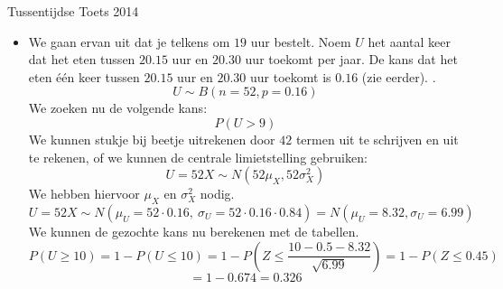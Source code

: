 \documentclass[main.tex]{subfiles}
\begin{document}
\begin{examenvraag}{Tussentijdse Toets 2014}
\begin{ex-antwoord}
\begin{itemize}
\begin{itemize}
        $P(A|B)$ is de kans op de gegeven wachttijd, gegeven dat we bij Yumm's bestellen.
        \[ P(A|B) = P(75 \le X \le 90) \]
        Omdat $X$ normaal verdeeld is, kunnen we deze kans berekenen met behulp van onze tabellen.
        \[ P(75 \le X \le 90) = P(\frac{75-60}{20} \le Z \le \frac{90-60}{20}) = P(Z \le 1.5) - P(Z \le 0.75)\]
        \[ = 0.933 - 0.773 = \frac{4}{25} = 0.16 \]
      \item $P(A|B^{C})$:\\
        $P(A|B^{C})$ is de kans op de gegeven wachttijd, gegeven dat we bij Tasty bestellen.
        \[ P(A|B^{C} = P(75 \le Y \le 90) \]
        Omdat $Y$ normaal verdeeld is, kunnen we deze kans berekenen met behulp van onze tabellen.
        \[ P(75 \le Y \le 90) = P(\frac{75-75}{10} \le Z \le \frac{90-75}{10}) = P(Z \le 1.5) - P(Z \le 0) \]
        \[ = 0.933 - 0.5 = \frac{433}{1000} = 0.433 \]
      \end{itemize}
      We kunnen nu de gevraagde kans uitrekenen:
      \[ \frac{P(A|B)P(B)}{P(A|B)P(B) + P(A|B^{C})P(B^{C})} = \frac{\frac{4}{25}\frac{6}{10}}{\frac{4}{25}\frac{6}{10} + \frac{433}{1000}\frac{4}{10}} = \frac{240}{673} = 0.3566 \]

    \item 
      We gaan ervan uit dat je telkens om $19$ uur bestelt.
      Noem $U$ het aantal keer dat het eten tussen $20.15$ uur en $20.30$ uur toekomt per jaar.
      De kans dat het eten \'e\'en keer tussen $20.15$ uur en $20.30$ uur toekomt is $0.16$ (zie eerder).
      .
      \[ U \sim B(n=52, p=0.16) \]
      We zoeken nu de volgende kans:
      \[ P(U > 9) \]
      We kunnen stukje bij beetje uitrekenen door $42$ termen uit te schrijven en uit te rekenen, of we kunnen de centrale limietstelling gebruiken:
      \[ U = 52 X \sim N(52\mu_{X},52\sigma_{X}^{2}) \]
      We hebben hiervoor $\mu_{X}$ en $\sigma_{X}^{2}$ nodig.
      \[ U = 52 X \sim N(\mu_{U}= 52\cdot 0.16,\ \sigma_{U} = 52\cdot 0.16 \cdot 0.84) = N(\mu_{U}=8.32,\sigma_{U}=6.99) \]
      We kunnen de gezochte kans nu berekenen met de tabellen.
      \[ P(U \ge 10) = 1 - P(U \le 10) = 1 - P\left(Z \le \frac{10-0.5-8.32}{\sqrt{6.99}} \right) = 1 - P(Z \le 0.45) \]
      \[ = 1-0.674 = 0.326 \]
    \end{itemize}
  \end{ex-antwoord}
\end{examenvraag}
\end{document}
